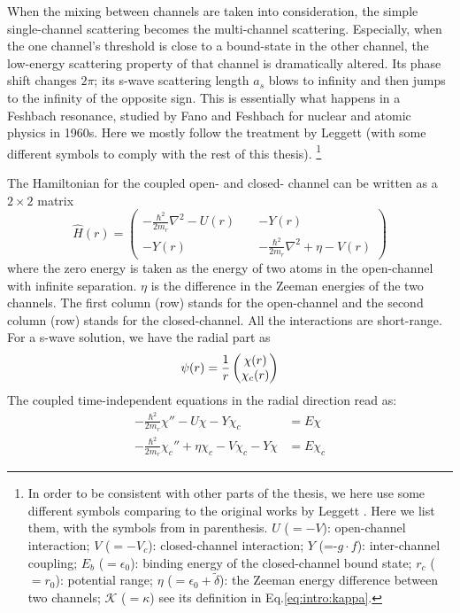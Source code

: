 When the mixing between channels are taken into consideration, the simple single-channel scattering becomes the multi-channel scattering.  Especially, when the one channel's threshold is close to a bound-state in the other channel, the low-energy scattering property of that channel is dramatically altered.  Its phase shift  changes $2\pi$;  its s-wave scattering length $a_{s}$ blows to infinity and then jumps to the infinity of the opposite sign.  This is essentially what happens in a Feshbach resonance, studied by Fano\cite{Fano} and Feshbach \cite{nuclear} for nuclear and atomic physics in 1960s.  Here we  mostly follow the treatment by Leggett \cite{Leggett} (with some different symbols to comply with the rest of this thesis). 
\footnote{In order to be consistent  with  other parts of the thesis, we here use some different symbols comparing to the original works by Leggett \cite{Leggett}.  Here we list them, with the symbols from \cite{Leggett} in parenthesis.  $U$ ($=-V$): open-channel interaction; $V$ ($=-V_{c}$): closed-channel interaction; $Y$ (=-$g\cdot{}f$): inter-channel coupling; $E_{b}$ ($=\epsilon_{0}$): binding energy of the closed-channel bound state; $r_{c}$ ($=r_{0}$): potential range; $\eta$ ($=\epsilon_0+\tilde\delta$): the Zeeman energy difference between two channels; $\mathcal{K}$ ($=\kappa$) see its definition in Eq.\ref{eq:intro:kappa}.}

The  Hamiltonian for  the coupled open- and  closed- channel can be written as a $2\times2$ matrix 
\begin{equation}\label{eq:intro:ham}
\hat{H}(r)=
\begin{pmatrix}
-\frac{\hbar^{2}}{2m_{r}}\nabla^{2}-U(r)&\;&-Y(r)\\
-Y(r)&\;&-\frac{\hbar^{2}}{2m_{r}}\nabla^{2}+\eta-V(r)
\end{pmatrix}
\end{equation}
where the  zero energy is taken as the energy of two atoms in the open-channel with infinite separation. $\eta$ is the  difference in the Zeeman energies of the two channels.  The first column (row) stands for the open-channel and the second column (row) stands for the closed-channel.  All the interactions are short-range.  For a s-wave solution, we have the radial part as 
\begin{equation}
\psi(r)=\frac{1}{r}\begin{pmatrix}\chi(r)\\\chi_{c}(r)\end{pmatrix}
\end{equation}
The coupled time-independent \sch equations in the radial direction read as:
\begin{align}
-\frac{\hbar^{2}}{2m_{r}}\chi''-U\chi-Y\chi_c&=E\chi\label{eq:intro:open}\\
-\frac{\hbar^{2}}{2m_{r}}\chi_c''+\eta\chi_c-V\chi_c-Y\chi&=E\chi_c\label{eq:intro:close}
\end{align}

